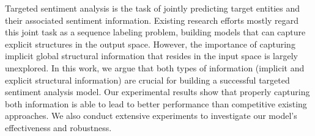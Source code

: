 Targeted sentiment analysis is the task of jointly predicting target entities and their associated sentiment information.
Existing research efforts mostly regard this joint task as a sequence labeling problem, building models that can capture explicit structures in the output space.
However, the importance of capturing implicit global structural information that resides in the input space is largely unexplored.
In this work, we argue that both types of information (implicit and explicit structural information) are crucial for building a successful targeted sentiment analysis model.
Our experimental results show that properly capturing both information is able to lead to better performance than competitive existing approaches.
We also conduct extensive experiments to investigate our model's effectiveness and robustness.